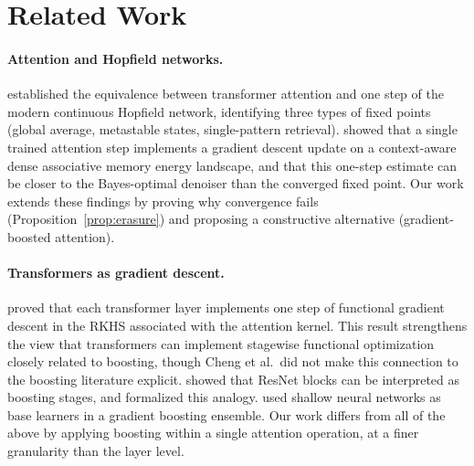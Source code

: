 \documentclass{article}
\theoremstyle{definition}
\begin{document}
\section{Related Work}
\label{sec:related}

\paragraph{Attention and Hopfield networks.}
\citet{ramsauer2021hopfield} established the equivalence between transformer attention and one step of the modern continuous Hopfield network, identifying three types of fixed points (global average, metastable states, single-pattern retrieval).
\citet{smart2025incontext} showed that a single trained attention step implements a gradient descent update on a context-aware dense associative memory energy landscape, and that this one-step estimate can be closer to the Bayes-optimal denoiser than the converged fixed point.
Our work extends these findings by proving why convergence fails (Proposition~\ref{prop:erasure}) and proposing a constructive alternative (gradient-boosted attention).

\paragraph{Transformers as gradient descent.}
\citet{cheng2024transformers} proved that each transformer layer implements one step of functional gradient descent in the RKHS associated with the attention kernel.
This result strengthens the view that transformers can implement stagewise functional optimization closely related to boosting, though Cheng et al.\ did not make this connection to the boosting literature explicit.
\citet{huang2018learning} showed that ResNet blocks can be interpreted as boosting stages, and \citet{siu2019residual} formalized this analogy.
\citet{badirli2020grownet} used shallow neural networks as base learners in a gradient boosting ensemble.
Our work differs from all of the above by applying boosting within a single attention operation, at a finer granularity than the layer level.
\end{document}
